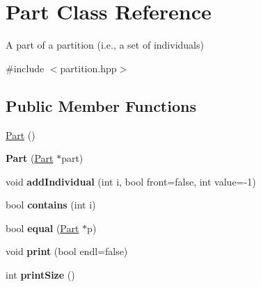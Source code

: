 \hypertarget{class_part}{\section{Part Class Reference}
\label{class_part}
}


A part of a partition (i.\-e., a set of individuals)  




{\ttfamily \#include $<$partition.\-hpp$>$}

\subsection*{Public Member Functions}
\begin{DoxyCompactItemize}
\item 
\hyperlink{class_part_a09385851011125e4f9bbe1c4712f1e1f}{Part} ()
\item 
\hypertarget{class_part_a4fc5eedff4d310041e3ebee54693f4ac}{{\bfseries Part} (\hyperlink{class_part}{Part} $\ast$part)}\label{class_part_a4fc5eedff4d310041e3ebee54693f4ac}

\item 
\hypertarget{class_part_a4f5392674db4c546b35c5a87dec8d204}{void {\bfseries add\-Individual} (int i, bool front=false, int value=-\/1)}\label{class_part_a4f5392674db4c546b35c5a87dec8d204}

\item 
\hypertarget{class_part_aad63cc5e3df656d4b847a6ad948dbf3d}{bool {\bfseries contains} (int i)}\label{class_part_aad63cc5e3df656d4b847a6ad948dbf3d}

\item 
\hypertarget{class_part_a8b37a2433f60fba0c5dcce393e4f5a86}{bool {\bfseries equal} (\hyperlink{class_part}{Part} $\ast$p)}\label{class_part_a8b37a2433f60fba0c5dcce393e4f5a86}

\item 
\hypertarget{class_part_a2d3c13012c781d8651b820e60d57c724}{void {\bfseries print} (bool endl=false)}\label{class_part_a2d3c13012c781d8651b820e60d57c724}

\item 
\hypertarget{class_part_a501f9fdbc4efd9ce00e1eef4a07f033e}{int {\bfseries print\-Size} ()}\label{class_part_a501f9fdbc4efd9ce00e1eef4a07f033e}

\end{DoxyCompactItemize}
